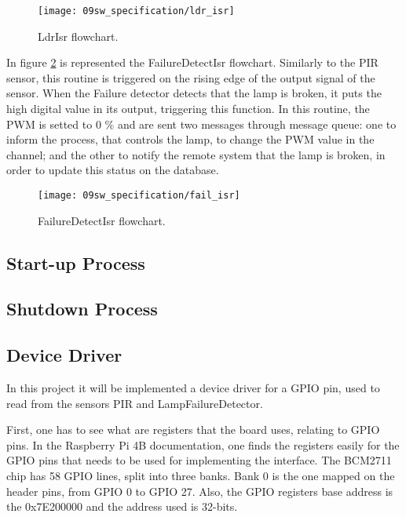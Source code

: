 \begin{figure}[H]
	\centering
	\texttt{[image: 09sw\_specification/ldr\_isr]}
	\caption{LdrIsr flowchart.}
	\label{fig:ldr_isr}
\end{figure}

In figure \ref{fig:fail_isr} is represented the FailureDetectIsr flowchart. Similarly to the PIR sensor, this routine is triggered on the rising edge of the output signal of the sensor. When the Failure detector detects that the lamp is broken, it puts the high digital value in its output, triggering this function. In this routine, the PWM is setted to 0 \% and are sent two messages through message queue: one to inform the process, that controls the lamp, to change the PWM value in the channel; and the other to notify the remote system that the lamp is broken, in order to update this status on the database.

\begin{figure}[H]
	\centering
	\texttt{[image: 09sw\_specification/fail\_isr]}
	\caption{FailureDetectIsr flowchart.}
	\label{fig:fail_isr}
\end{figure}

\subsection{Start-up Process}
\subsection{Shutdown Process}

\clearpage
\subsection{Device Driver}
In this project it will be implemented a device driver for a GPIO pin, used to read from the sensors PIR and LampFailureDetector.

First, one has to see what are registers that the board uses, relating to GPIO pins. In the Raspberry Pi 4B documentation, one finds the registers easily for the GPIO pins that needs to be used for implementing the interface. The BCM2711 chip has 58 GPIO lines, split into three banks. Bank 0 is the one mapped on the header pins, from GPIO 0 to GPIO 27. Also, the GPIO registers base address is the 0x7E200000 and the address used is 32-bits.


